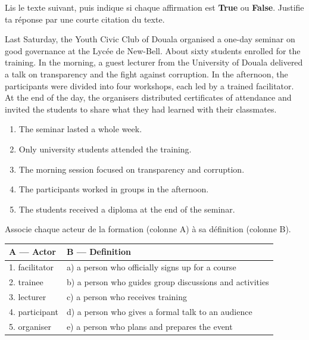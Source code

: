 \documentclass[11pt]{article}
\begin{document}
\begin{exercice}
Lis le texte suivant, puis indique si chaque affirmation est \textbf{True} ou \textbf{False}. Justifie ta réponse par une courte citation du texte.

\begin{textebox}
Last Saturday, the Youth Civic Club of Douala organised a one-day seminar on good governance at the Lycée de New-Bell. About sixty students enrolled for the training. In the morning, a guest lecturer from the University of Douala delivered a talk on transparency and the fight against corruption. In the afternoon, the participants were divided into four workshops, each led by a trained facilitator. At the end of the day, the organisers distributed certificates of attendance and invited the students to share what they had learned with their classmates.
\end{textebox}

\begin{enumerate}
\item The seminar lasted a whole week.
\item Only university students attended the training.
\item The morning session focused on transparency and corruption.
\item The participants worked in groups in the afternoon.
\item The students received a diploma at the end of the seminar.
\end{enumerate}
\end{exercice}

\begin{exercice}
Associe chaque acteur de la formation (colonne A) à sa définition (colonne B).

\begin{center}
\begin{tabularx}{\linewidth}{|l|X|}
\hline
\rowcolor{popblueL} \textbf{A — Actor} & \textbf{B — Definition} \\
\hline
1. facilitator & a) a person who officially signs up for a course \\
\hline
2. trainee & b) a person who guides group discussions and activities \\
\hline
3. lecturer & c) a person who receives training \\
\hline
4. participant & d) a person who gives a formal talk to an audience \\
\hline
5. organiser & e) a person who plans and prepares the event \\
\hline
\end{tabularx}
\end{center}
\end{exercice}
\end{document}
